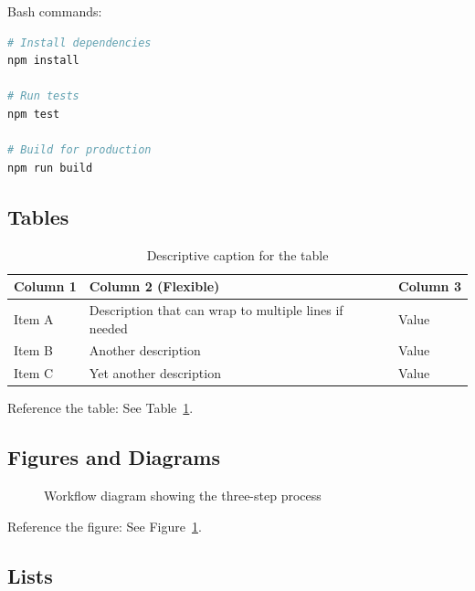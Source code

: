 Bash commands:

\begin{lstlisting}[language=bash]
# Install dependencies
npm install

# Run tests
npm test

# Build for production
npm run build
\end{lstlisting}

\subsection{Tables}

\begin{table}[htbp]
\centering
\small
\begin{tabularx}{\textwidth}{lXl}
\toprule
\textbf{Column 1} & \textbf{Column 2 (Flexible)} & \textbf{Column 3} \\
\midrule
Item A & Description that can wrap to multiple lines if needed & Value \\
Item B & Another description & Value \\
Item C & Yet another description & Value \\
\bottomrule
\end{tabularx}
\caption{Descriptive caption for the table}
\label{tab:tablename}
\end{table}

Reference the table: See Table~\ref{tab:tablename}.

\subsection{Figures and Diagrams}

\begin{figure}[htbp]
\centering
{}
\caption{Workflow diagram showing the three-step process}
\label{fig:workflow}
\end{figure}

Reference the figure: See Figure~\ref{fig:workflow}.

\subsection{Lists}

